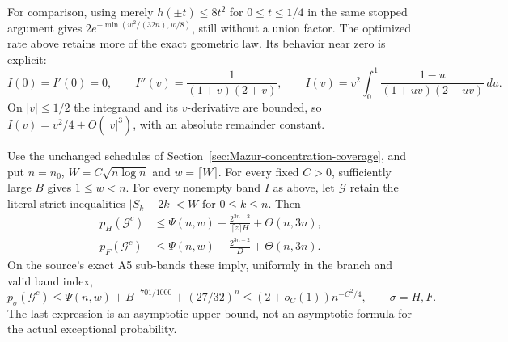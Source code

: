 For comparison, using merely $h(\pm t)\le8t^2$ for $0\le t\le1/4$
in the same stopped argument gives
$2e^{-\min(w^2/(32n),w/8)}$, still without a union factor.
The optimized rate above retains more of the exact geometric law.
Its behavior near zero is explicit:
\[
 I(0)=I'(0)=0,\qquad I''(v)=\frac1{(1+v)(2+v)},\qquad
 I(v)=v^2\int_0^1\frac{1-u}{(1+uv)(2+uv)}\,du.
\]
On $|v|\le1/2$ the integrand and its $v$-derivative are bounded,
so $I(v)=v^2/4+O(|v|^3)$, with an absolute remainder constant.

\begin{corollary}
\label{cor:Mazur-band-fullgood}
Use the unchanged schedules of
Section~\ref{sec:Mazur-concentration-coverage}, and put $n=n_0$,
$W=C\sqrt{n\log n}$ and $w=\lceil W\rceil$.
For every fixed $C>0$, sufficiently large $B$ gives $1\le w<n$.
For every nonempty band $I$ as above, let $\mathcal G$ retain the
literal strict inequalities $|S_k-2k|<W$ for $0\le k\le n$.
Then
\begin{align}
 p_H(\mathcal G^c)
 &\le \Psi(n,w)+\frac{2^{3n-2}}{\lceil z\rceil H}
                  +\Theta(n,3n), \label{eq:Mazur-harmonic-fullgood}\\
 p_F(\mathcal G^c)
 &\le \Psi(n,w)+\frac{2^{3n-2}}{D}
                  +\Theta(n,3n). \label{eq:Mazur-flat-fullgood}
\end{align}
On the source's exact A5 sub-bands these imply, uniformly in the
branch and valid band index,
\begin{equation}
 p_\sigma(\mathcal G^c)
 \le\Psi(n,w)+B^{-701/1000}+(27/32)^n
 \le(2+o_C(1))n^{-C^2/4},\qquad \sigma=H,F.
 \label{eq:Mazur-band-fullgood-rate}
\end{equation}
The last expression is an asymptotic upper bound, not an asymptotic
formula for the actual exceptional probability.
\end{corollary}
